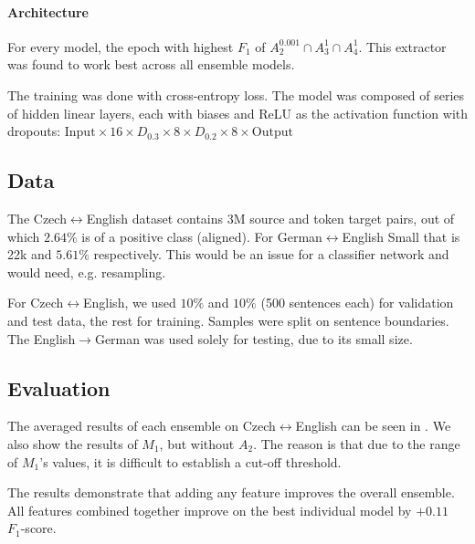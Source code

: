 \paragraph{Architecture} For every model, the epoch with highest $F_1$ of $A_2^{0.001} \cap A_3^{1} \cap A_4^{1}$. This extractor was found to work best across all ensemble models.

The training was done with cross-entropy loss. The model was composed of series of hidden linear layers, each with biases and ReLU as the activation function with dropouts: $\text{Input}\times 16 \times D_{0.3} \times 8 \times D_{0.2} \times 8 \times \text{Output}$ 

\subsection{Data}

The Czech$\leftrightarrow$English dataset contains 3M source and token target pairs, out of which $2.64\%$ is of a positive class (aligned). For German$\leftrightarrow$English Small that is 22k and $5.61\%$ respectively. This would be an issue for a classifier network and would need, e.g. resampling.

For Czech$\leftrightarrow$English, we used $10\%$ and $10\%$ (500 sentences each) for validation and test data, the rest for training. Samples were split on sentence boundaries. The English$\rightarrow$German was used solely for testing, due to its small size.

\subsection{Evaluation}

The averaged results of each ensemble on Czech$\leftrightarrow$English can be seen in . We also show the results of $M_1$, but without $A_2$. The reason is that due to the range of $M_1$'s values, it is difficult to establish a cut-off threshold.

The results demonstrate that adding any feature improves the overall ensemble. All features combined together improve on the best individual model by $+0.11$\, $F_1$-score.

